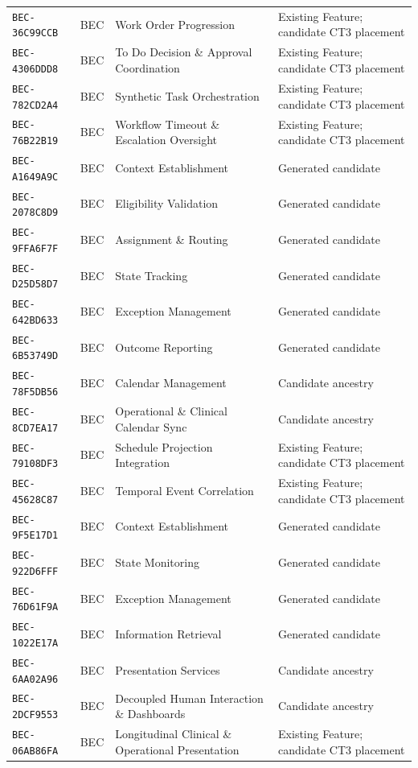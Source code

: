 \documentclass[11pt,a4paper,openany]{book}
\begin{document}
\begin{longtable}{@{}p{.19\linewidth}p{.12\linewidth}p{.39\linewidth}p{.24\linewidth}@{}}
\texttt{BEC-36C99CCB} & BEC & Work Order Progression & Existing Feature; candidate CT3 placement \\
\texttt{BEC-4306DDD8} & BEC & To Do Decision \& Approval Coordination & Existing Feature; candidate CT3 placement \\
\texttt{BEC-782CD2A4} & BEC & Synthetic Task Orchestration & Existing Feature; candidate CT3 placement \\
\texttt{BEC-76B22B19} & BEC & Workflow Timeout \& Escalation Oversight & Existing Feature; candidate CT3 placement \\
\texttt{BEC-A1649A9C} & BEC & Context Establishment & Generated candidate \\
\texttt{BEC-2078C8D9} & BEC & Eligibility Validation & Generated candidate \\
\texttt{BEC-9FFA6F7F} & BEC & Assignment \& Routing & Generated candidate \\
\texttt{BEC-D25D58D7} & BEC & State Tracking & Generated candidate \\
\texttt{BEC-642BD633} & BEC & Exception Management & Generated candidate \\
\texttt{BEC-6B53749D} & BEC & Outcome Reporting & Generated candidate \\
\texttt{BEC-78F5DB56} & BEC & Calendar Management & Candidate ancestry \\
\texttt{BEC-8CD7EA17} & BEC & Operational \& Clinical Calendar Sync & Candidate ancestry \\
\texttt{BEC-79108DF3} & BEC & Schedule Projection Integration & Existing Feature; candidate CT3 placement \\
\texttt{BEC-45628C87} & BEC & Temporal Event Correlation & Existing Feature; candidate CT3 placement \\
\texttt{BEC-9F5E17D1} & BEC & Context Establishment & Generated candidate \\
\texttt{BEC-922D6FFF} & BEC & State Monitoring & Generated candidate \\
\texttt{BEC-76D61F9A} & BEC & Exception Management & Generated candidate \\
\texttt{BEC-1022E17A} & BEC & Information Retrieval & Generated candidate \\
\texttt{BEC-6AA02A96} & BEC & Presentation Services & Candidate ancestry \\
\texttt{BEC-2DCF9553} & BEC & Decoupled Human Interaction \& Dashboards & Candidate ancestry \\
\texttt{BEC-06AB86FA} & BEC & Longitudinal Clinical \& Operational Presentation & Existing Feature; candidate CT3 placement \\

\end{longtable}
\end{document}
